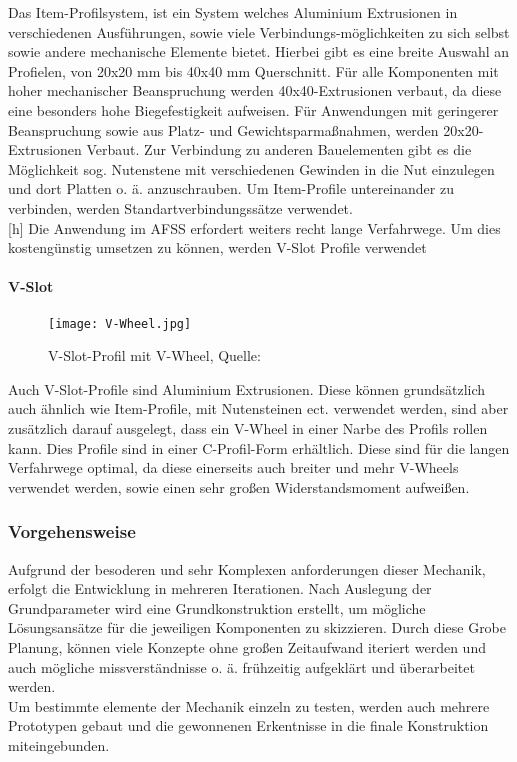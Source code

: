 Das Item-Profilsystem, ist ein System welches Aluminium Extrusionen in verschiedenen Ausführungen, sowie viele Verbindungs-möglichkeiten zu sich selbst sowie andere mechanische Elemente bietet. Hierbei gibt es eine breite Auswahl an Profielen, von 20x20 mm bis 40x40 mm Querschnitt. Für alle Komponenten mit hoher mechanischer Beanspruchung werden 40x40-Extrusionen verbaut, da diese eine besonders hohe Biegefestigkeit aufweisen. Für Anwendungen mit geringerer Beanspruchung sowie aus Platz- und Gewichtsparmaßnahmen, werden 20x20-Extrusionen Verbaut. 
Zur Verbindung zu anderen Bauelementen gibt es die Möglichkeit sog. Nutenstene mit verschiedenen Gewinden in die Nut einzulegen und dort Platten o. ä. anzuschrauben. Um Item-Profile untereinander zu verbinden, werden Standartverbindungssätze verwendet. \\
\vspace{4mm}[h]
Die Anwendung im AFSS erfordert weiters recht lange Verfahrwege. Um dies kostengünstig umsetzen zu können, werden V-Slot Profile verwendet

\paragraph{V-Slot}

\begin{wrapfigure}{R}{0.3\textwidth}
    \texttt{[image: V-Wheel.jpg]}
    \centering
    \caption{V-Slot-Profil mit V-Wheel, Quelle: \cite{v_slot_wheel}}
\end{wrapfigure}

Auch V-Slot-Profile sind Aluminium Extrusionen. Diese können grundsätzlich auch ähnlich wie Item-Profile, mit Nutensteinen ect. verwendet werden, sind aber zusätzlich darauf ausgelegt, dass ein V-Wheel in einer Narbe des Profils rollen kann. Dies Profile sind in einer C-Profil-Form erhältlich. Diese sind für die langen Verfahrwege optimal, da diese einerseits auch breiter und mehr V-Wheels verwendet werden, sowie einen sehr großen Widerstandsmoment aufweißen. 


\subsubsection{Vorgehensweise}
Aufgrund der besoderen und sehr Komplexen anforderungen dieser Mechanik, erfolgt die Entwicklung in mehreren Iterationen. Nach Auslegung der Grundparameter wird eine Grundkonstruktion erstellt, um mögliche Lösungsansätze für die jeweiligen Komponenten zu skizzieren. Durch diese Grobe Planung, können viele Konzepte ohne großen Zeitaufwand iteriert werden und auch mögliche missverständnisse o. ä. frühzeitig aufgeklärt und überarbeitet werden. \\
Um bestimmte elemente der Mechanik einzeln zu testen, werden auch mehrere Prototypen gebaut und die gewonnenen Erkentnisse in die finale Konstruktion miteingebunden. \\


